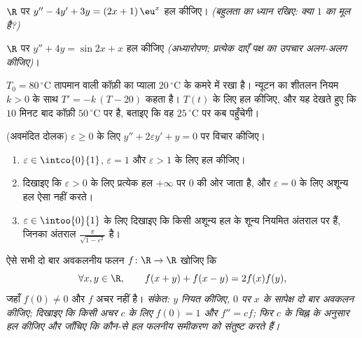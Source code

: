 \begin{exercise}[$\star\star$]\label{exo:b1:diffeq:6}
$\R$ पर $y'' - 4y' + 3y = (2x + 1)\,\eu^{x}$ हल कीजिए। \emph{(बहुलता का
ध्यान रखिए: क्या $1$  का मूल है?)}
\end{exercise}

\begin{exercise}[$\star\star$]\label{exo:b1:diffeq:7}
$\R$ पर $y'' + 4y = \sin 2x + x$ हल कीजिए \emph{(अध्यारोपण; प्रत्येक दाएँ
पक्ष का उपचार अलग-अलग कीजिए)}।
\end{exercise}

\begin{exercise}[$\star\star$]\label{exo:b1:diffeq:8}
$T_0 = 80\,^\circ$C तापमान वाली कॉफ़ी का प्याला $20\,^\circ$C के कमरे में
रखा है। न्यूटन का शीतलन नियम $k > 0$ के साथ $T' = -k\,(T - 20)$ कहता है।
$T(t)$ के लिए हल कीजिए, और यह देखते हुए कि $10$ मिनट बाद कॉफ़ी $50\,^\circ$C
पर है, बताइए कि वह $25\,^\circ$C पर कब पहुँचेगी।
\end{exercise}

\begin{exercise}[$\star\star\star$]\label{exo:b1:diffeq:9}
(अवमंदित दोलक) $\varepsilon \geq 0$ के लिए $y'' + 2\varepsilon y' + y = 0$
पर विचार कीजिए।
\begin{enumerate}
  \item $\varepsilon \in \intco{0}{1}$, $\varepsilon = 1$ और $\varepsilon >
  1$ के लिए हल कीजिए।
  \item दिखाइए कि $\varepsilon > 0$ के लिए प्रत्येक हल $+\infty$ पर $0$ की
  ओर जाता है, और $\varepsilon = 0$ के लिए अशून्य हल ऐसा नहीं करते।
  \item $\varepsilon \in \intoo{0}{1}$ के लिए दिखाइए कि किसी अशून्य हल के
  शून्य नियमित अंतराल पर हैं, जिनका अंतराल $\frac{\pi}{\sqrt{1 -
  \varepsilon^2}}$ है।
\end{enumerate}
\end{exercise}

\begin{exercise}[$\star\star\star$]\label{exo:b1:diffeq:10}
ऐसे सभी दो बार अवकलनीय फलन $f \colon \R \to \R$ खोजिए कि
\[
\forall x, y \in \R, \qquad f(x + y) + f(x - y) = 2 f(x) f(y),
\]
जहाँ $f(0) \ne 0$ और $f$ अचर नहीं है। \emph{संकेत: $y$ नियत कीजिए, $0$ पर
$x$ के सापेक्ष दो बार अवकलन कीजिए; दिखाइए कि किसी अचर $c$ के लिए $f(0) = 1$
और $f'' = c f$; फिर $c$ के चिह्न के अनुसार हल कीजिए और जाँचिए कि कौन-से हल
फलनीय समीकरण को संतुष्ट करते हैं।}
\end{exercise}

